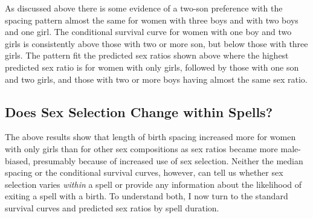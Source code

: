 \documentclass[12pt,letterpaper]{article}
\begin{document}
As discussed above there is some evidence of a two-son preference with
the spacing pattern almost the same for women with three boys and with
two boys and one girl.
The conditional survival curve for women with one boy and two girls is
consistently above those with two or more son, but below those with
three girls.
The pattern fit the predicted sex ratios shown above where the highest
predicted sex ratio is for women with only girls, followed by those
with one son and two girls, and those with two or more boys having
almost the same sex ratio.



\subsection{Does Sex Selection Change within Spells?}

The above results show that length of birth spacing increased 
more for women with only girls than for other sex compositions
as sex ratios became more male-biased, presumably because
of increased use of sex selection.
Neither the median spacing or the conditional survival curves,
however, can tell us whether sex selection varies \emph{within}
a spell or provide any information about the likelihood of
exiting a spell with a birth.
To understand both, I now turn to the standard survival curves
and predicted sex ratios by spell duration.
\end{document}
